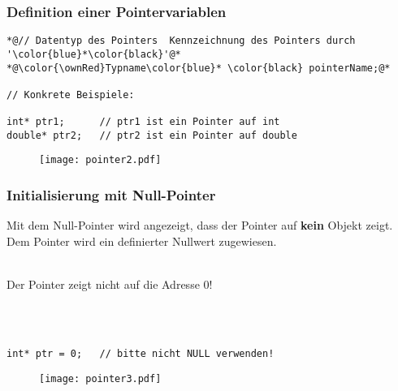 \subsubsection{Definition einer Pointervariablen\hfill}
\label{sec:Definition einer Pointervariablen}
\noindent
\begin{minipage}{\linewidth}
\begin{lstlisting}
*@// Datentyp des Pointers	Kennzeichnung des Pointers durch '\color{blue}*\color{black}'@*
*@\color{\ownRed}Typname\color{blue}* \color{black} pointerName;@*

// Konkrete Beispiele:

int* ptr1;		// ptr1 ist ein Pointer auf int
double* ptr2;	// ptr2 ist ein Pointer auf double
\end{lstlisting}
\end{minipage}
\begin{figure}[h]
	\centering
	\texttt{[image: pointer2.pdf]}
\end{figure}

\subsubsection{Initialisierung mit Null-Pointer\hfill}
\label{sec_Initialisierung mit Null-Pointer}
Mit dem Null-Pointer wird angezeigt, dass der Pointer auf \textbf{kein} Objekt zeigt. Dem Pointer wird ein definierter Nullwert zugewiesen.\\
\\
\begin{hinweis}
Der Pointer zeigt nicht auf die Adresse 0!
\end{hinweis}
\\
\\
\noindent
\begin{minipage}{\linewidth}
\begin{lstlisting}
int* ptr = 0;	// bitte nicht NULL verwenden!
\end{lstlisting}
\end{minipage}
\begin{figure}[h]
	\centering
	\texttt{[image: pointer3.pdf]}
\end{figure}

